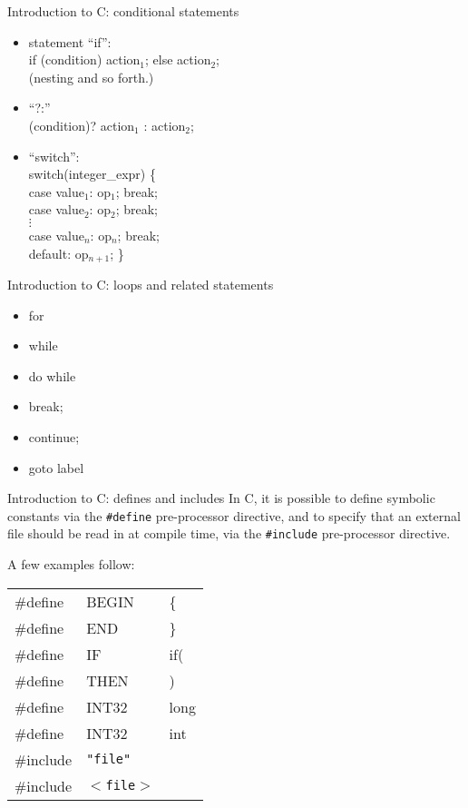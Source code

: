 \begin{frame}[fragile]{Introduction to C: conditional statements}
\begin{itemize}
\item statement ``if'':     \\
      if (condition) action${}_1$; else action${}_2$; \\
      (nesting and so forth.)
\item ``?:'' \\
      (condition)? action${}_1$ : action${}_2$;
\item ``switch'': \\
      switch(integer\_expr) \{  \\
      case value${}_1$: op${}_1$; break; \\
      case value${}_2$: op${}_2$; break; \\
      $\vdots$ \\
      case value${}_n$: op${}_n$; break; \\
      default: op${}_{n+1}$; \}
\end{itemize}


\end{frame}
\begin{frame}[fragile]{Introduction to C: loops and related statements}
\begin{itemize}
\item for
\item while
\item do while
\item break;
\item continue;
\item goto label
\end{itemize}


\end{frame}
\begin{frame}[fragile]{Introduction to C: defines and includes}
In C, it is possible to define symbolic constants via the \verb"#define"
pre-processor directive, and to specify that an external file should
be read in at compile time, via the \verb"#include"
pre-processor directive.


\vspace{20pt}

A few examples follow:

\begin{tabular}{||lll||} \hline\hline
\#define\index{\#DEFINE} & BEGIN & \{  \\
\#define & END   & \}  \\
\#define & IF    & if( \\
\#define & THEN  & ) \\
\#define & INT32 & long \\
\#define & INT32 & int \\
\#include & {\tt "file"} & \\
\#include & {\tt $<$file$>$} & \\ \hline\hline
\end{tabular}



\end{frame}
